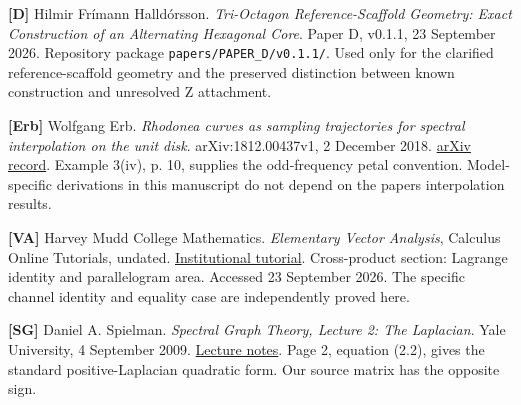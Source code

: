 \documentclass[
  11pt,
  a4paper,
]{article}
\begin{document}
\textbf{{[}D{]}} Hilmir Frímann Halldórsson. \emph{Tri-Octagon Reference-Scaffold Geometry: Exact Construction of an Alternating Hexagonal Core}. Paper D, v0.1.1, 23 September 2026. Repository package \texttt{papers/PAPER\_D/v0.1.1/}. Used only for the clarified reference-scaffold geometry and the preserved distinction between known construction and unresolved Z attachment.

\textbf{{[}Erb{]}} Wolfgang Erb. \emph{Rhodonea curves as sampling trajectories for spectral interpolation on the unit disk}. arXiv:1812.00437v1, 2 December 2018. \href{https://arxiv.org/abs/1812.00437}{arXiv record}. Example 3(iv), p. 10, supplies the odd-frequency petal convention. Model-specific derivations in this manuscript do not depend on the paper\textquotesingle s interpolation results.

\textbf{{[}VA{]}} Harvey Mudd College Mathematics. \emph{Elementary Vector Analysis}, Calculus Online Tutorials, undated. \href{https://math.hmc.edu/calculus/hmc-mathematics-calculus-online-tutorials/multivariable-calculus/elementary-vector-analysis/}{Institutional tutorial}. Cross-product section: Lagrange identity and parallelogram area. Accessed 23 September 2026. The specific channel identity and equality case are independently proved here.

\textbf{{[}SG{]}} Daniel A. Spielman. \emph{Spectral Graph Theory, Lecture 2: The Laplacian}. Yale University, 4 September 2009. \href{https://www.cs.yale.edu/homes/spielman/561/2009/lect02-09.pdf}{Lecture notes}. Page 2, equation (2.2), gives the standard positive-Laplacian quadratic form. Our source matrix has the opposite sign.
\end{document}
